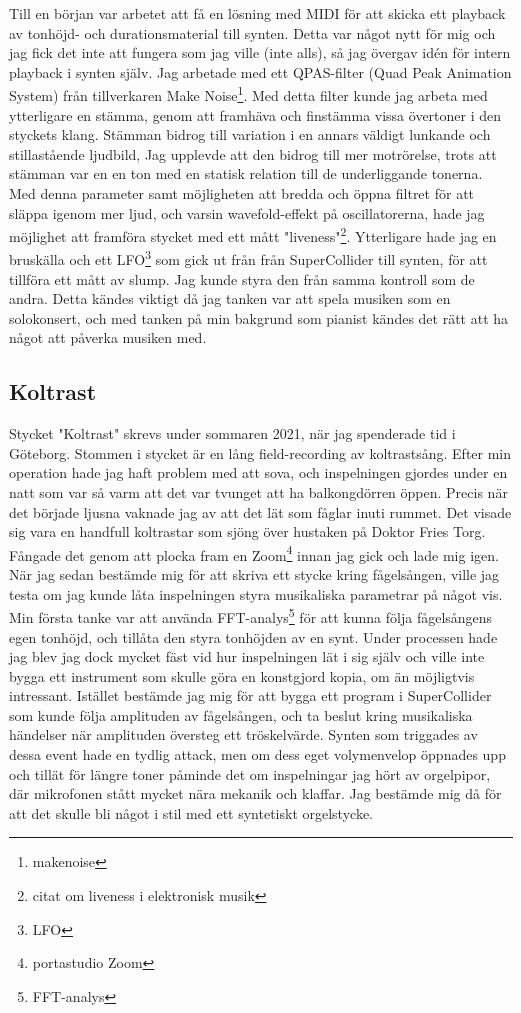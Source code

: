\documentclass{article}
\begin{document}
		Till en början var arbetet att få en lösning med MIDI för att skicka ett playback av tonhöjd- och
		durationsmaterial till synten. Detta var något nytt för mig och jag fick det inte att fungera som jag
		ville (inte alls), så jag övergav idén för intern playback i synten själv. 
		Jag arbetade med ett QPAS-filter (Quad Peak Animation System) från tillverkaren Make
		Noise\footnote{makenoise}. Med detta filter kunde jag arbeta med ytterligare en stämma, genom att
		framhäva och finstämma vissa övertoner i den styckets klang. Stämman bidrog till variation i en
		annars väldigt lunkande och stillastående ljudbild, Jag upplevde att den bidrog till mer motrörelse,
		trots att stämman var en en ton med en statisk relation till de underliggande tonerna. Med denna
		parameter samt möjligheten att bredda och öppna filtret för att släppa igenom mer ljud, och varsin
		wavefold-effekt på oscillatorerna, hade jag möjlighet att framföra stycket med ett mått
		"liveness"\footnote{citat om liveness i elektronisk musik}. Ytterligare hade jag en bruskälla och ett
		LFO\footnote{LFO} som gick ut från från SuperCollider till synten, för att tillföra ett mått av slump.
		Jag kunde styra den från samma kontroll som de andra. Detta kändes viktigt då jag tanken var att
		spela musiken som en solokonsert, och med tanken på min bakgrund som pianist kändes det rätt att ha
		något att påverka musiken med. 

	\subsection{Koltrast}
	Stycket "Koltrast" skrevs under sommaren 2021, när jag spenderade tid i Göteborg. Stommen i stycket är en
	lång field-recording av koltrastsång. Efter min operation hade jag haft problem med att sova, och
	inspelningen gjordes under en natt som var så varm att det var tvunget att ha balkongdörren öppen. Precis
	när det började ljusna vaknade jag av att det lät som fåglar inuti rummet. Det visade sig vara en handfull
	koltrastar som sjöng över hustaken på Doktor Fries Torg. Fångade det genom att plocka fram en
	Zoom\footnote{portastudio Zoom} innan jag gick och lade mig igen. 
		När jag sedan bestämde mig för att skriva ett stycke kring fågelsången, ville jag testa om jag kunde
	låta inspelningen styra musikaliska parametrar på något vis. Min första tanke var att använda
	FFT-analys\footnote{FFT-analys} för att kunna följa fågelsångens egen tonhöjd, och tillåta den styra
	tonhöjden av en synt. Under processen hade jag blev jag dock mycket fäst vid hur inspelningen lät i sig
	själv och ville inte bygga ett instrument som skulle göra en konstgjord kopia, om än möjligtvis
	intressant. Istället bestämde jag mig för att bygga ett program i SuperCollider som kunde följa amplituden
	av fågelsången, och ta beslut kring musikaliska händelser när amplituden översteg ett tröskelvärde. Synten
	som triggades av dessa event hade en tydlig attack, men om dess eget volymenvelop öppnades upp och tillät
	för längre toner påminde det om inspelningar jag hört av orgelpipor, där mikrofonen stått mycket nära
	mekanik och klaffar. Jag bestämde mig då för att det skulle bli något i stil med ett syntetiskt
	orgelstycke. 
\end{document}
